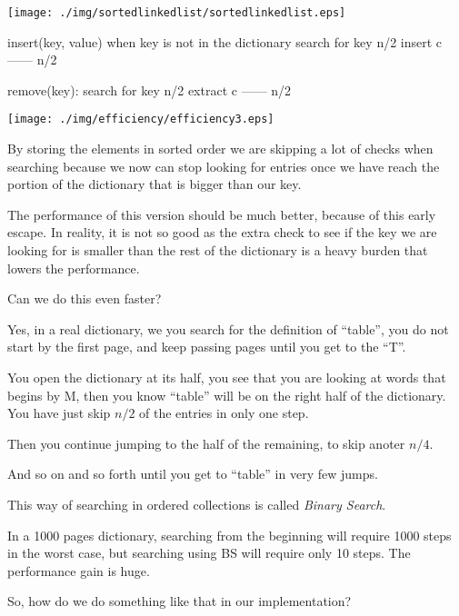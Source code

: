 \documentclass[a4paper, 9pt]{extarticle}
\begin{document}
\begin{center}
  \texttt{[image: ./img/sortedlinkedlist/sortedlinkedlist.eps]}
\end{center}

\begin{blackboard}
insert(key, value) when key is not in the dictionary
  search for key                              n/2
  insert                                      c
                                             ------
                                              n/2

remove(key):
  search for key                              n/2
  extract                                     c
                                             ------
                                              n/2
\end{blackboard}

\begin{multicols}{2}
\begin{center}
  \texttt{[image: ./img/efficiency/efficiency3.eps]}
\end{center}
\columnbreak

By storing the elements in sorted order we are skipping a lot of checks when
searching because we now can stop looking for entries once we have reach the
portion of the dictionary that is bigger than our key.

The performance of this version should be much better, because of this early
escape. In reality, it is not so good as the extra check to see if the key we
are looking for is smaller than the rest of the dictionary is a heavy burden
that lowers the performance.

Can we do this even faster?

Yes, in a real dictionary, we you search for the definition of ``table'', you
do not start by the first page, and keep passing pages until you get to the
``T''.

You open the dictionary at its half, you see that you are looking at words that
begins by M, then you know ``table'' will be on the right half of the
dictionary. You have just skip $n/2$ of the entries in only one step.

Then you continue jumping to the half of the remaining, to skip anoter $n/4$.

And so on and so forth until you get to ``table'' in very few jumps.

This way of searching in ordered collections is called \emph{Binary Search}.

In a 1000 pages dictionary, searching from the beginning will require 1000
steps in the worst case, but searching using BS will require only 10 steps. The
performance gain is huge.

So, how do we do something like that in our implementation?
\end{multicols}
\end{document}
